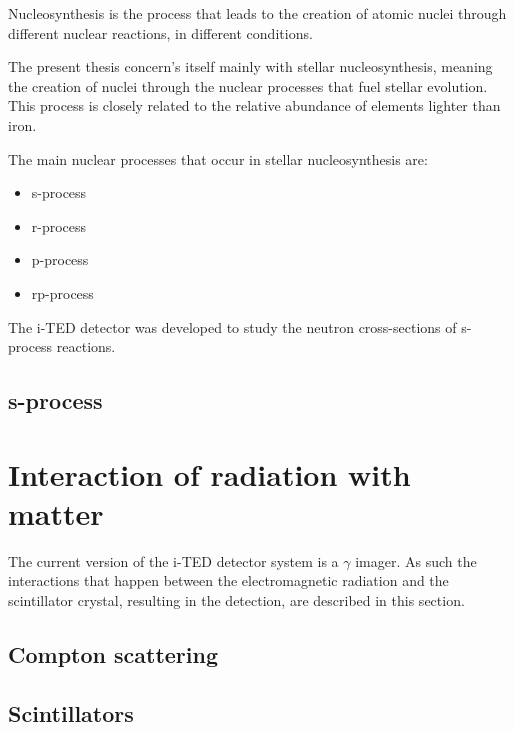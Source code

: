 Nucleosynthesis is the process that leads to the creation of atomic nuclei through different nuclear reactions, in different conditions.

The present thesis concern's itself mainly with stellar nucleosynthesis, meaning the creation of nuclei through the nuclear processes that fuel stellar evolution. This process is closely related to the relative abundance of elements lighter than iron.

The main nuclear processes that occur in stellar nucleosynthesis are:
\begin{itemize}
    \item s-process
    \item r-process
    \item p-process
    \item rp-process
\end{itemize}

The \ac{i-TED} detector was developed to study the neutron cross-sections of s-process reactions.

\subsection{s-process}



\section{Interaction of radiation with matter}\label{sec:interaction}

The current version of the \ac{i-TED} detector system is a $\gamma$ imager. As such the interactions that happen between the electromagnetic radiation and the scintillator crystal, resulting in the detection, are described in this section.

\subsection{Compton scattering}

\subsection{Scintillators}

